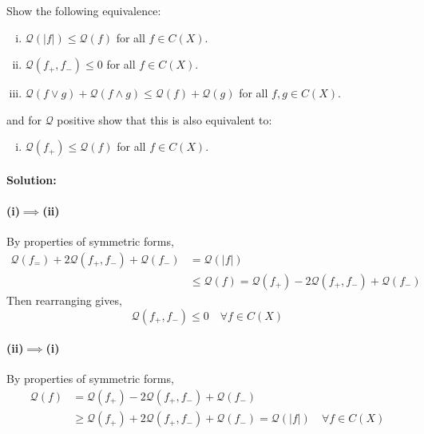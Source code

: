 Show the following equivalence:
\begin{enumerate}[(i)]
	\item
		$\mathcal{Q}(|f|) \leq \mathcal{Q}(f)$ for all $f\in C(X)$.
	\item
		$\mathcal{Q}(f_{+},f_{-}) \leq 0$ for all $f\in C(X)$.
	\item
		$\mathcal{Q}(f\vee g) + \mathcal{Q}(f\wedge g) \leq \mathcal{Q}(f) + \mathcal{Q}(g)$ for all $f,g\in C(X)$.
\end{enumerate}
and for $\mathcal{Q}$ positive show that this is also equivalent to:
\begin{enumerate}[(iv)]
	\item
		$\mathcal{Q}(f_{+}) \leq \mathcal{Q}(f)$ for all $f\in C(X)$.
\end{enumerate}

\paragraph{Solution:}

\paragraph{(i)$\implies$(ii)}
By properties of symmetric forms,
\begin{equation*}
	\begin{aligned}
		\mathcal{Q}(f_{=}) + 2\mathcal{Q}(f_{+},f_{-}) + \mathcal{Q}(f_{-}) &= \mathcal{Q}(|f|)\\
		&\leq \mathcal{Q}(f) = \mathcal{Q}(f_{+}) - 2\mathcal{Q}(f_{+},f_{-}) + \mathcal{Q}(f_{-})
	\end{aligned}
\end{equation*}
Then rearranging gives,
\begin{equation*}
	\mathcal{Q}(f_{+},f_{-}) \leq 0 \quad \forall f\in C(X)
\end{equation*}

\paragraph{(ii)$\implies$(i)}
By properties of symmetric forms,
\begin{equation*}
	\begin{aligned}
		\mathcal{Q}(f) &= \mathcal{Q}(f_{+}) - 2\mathcal{Q}(f_{+},f_{-}) + \mathcal{Q}(f_{-})\\
		&\geq \mathcal{Q}(f_{+}) + 2\mathcal{Q}(f_{+},f_{-}) + \mathcal{Q}(f_{-}) = \mathcal{Q}(|f|) \quad \forall f\in C(X)
	\end{aligned}
\end{equation*}

